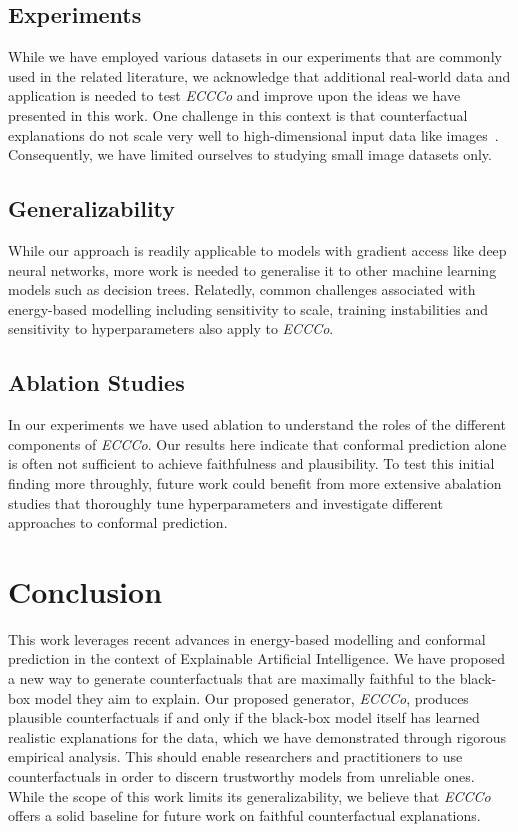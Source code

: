 \subsection{Experiments}

While we have employed various datasets in our experiments that are commonly used in the related literature, we acknowledge that additional real-world data and application is needed to test \textit{ECCCo} and improve upon the ideas we have presented in this work. One challenge in this context is that counterfactual explanations do not scale very well to high-dimensional input data like images~\citep{samoilescu2021model,chen2021seven}. Consequently, we have limited ourselves to studying small image datasets only. 

\subsection{Generalizability}

While our approach is readily applicable to models with gradient access like deep neural networks, more work is needed to generalise it to other machine learning models such as decision trees. Relatedly, common challenges associated with energy-based modelling including sensitivity to scale, training instabilities and sensitivity to hyperparameters also apply to \textit{ECCCo}.

\subsection{Ablation Studies}

In our experiments we have used ablation to understand the roles of the different components of \textit{ECCCo}. Our results here indicate that conformal prediction alone is often not sufficient to achieve faithfulness and plausibility. To test this initial finding more throughly, future work could benefit from more extensive abalation studies that thoroughly tune hyperparameters and investigate different approaches to conformal prediction. 

\section{Conclusion}

This work leverages recent advances in energy-based modelling and conformal prediction in the context of Explainable Artificial Intelligence. We have proposed a new way to generate counterfactuals that are maximally faithful to the black-box model they aim to explain. Our proposed generator, \textit{ECCCo}, produces plausible counterfactuals if and only if the black-box model itself has learned realistic explanations for the data, which we have demonstrated through rigorous empirical analysis. This should enable researchers and practitioners to use counterfactuals in order to discern trustworthy models from unreliable ones. While the scope of this work limits its generalizability, we believe that \textit{ECCCo} offers a solid baseline for future work on faithful counterfactual explanations.